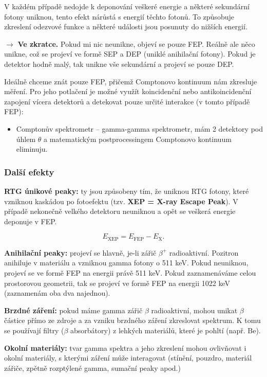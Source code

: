 V každém případě nedojde k deponování veškeré energie a některé sekundární fotony uniknou, tento efekt nárůstá s energií těchto fotonů. To způsobuje zkreslení odezvové funkce a některé události jsou posunuty do nižších energií.

$\rightarrow$ \textbf{Ve zkratce.} Pokud mi nic neunikne, objeví se pouze FEP. Reálně ale něco unikne, což se projeví ve formě SEP a DEP (uniklé anihilační fotony). Pokud je detektor hodně malý, tak unikne vše sekundární a projeví se pouze DEP.

Ideálně chceme znát pouze FEP, přičemž Comptonovo kontinuum nám zkresluje měření. Pro jeho potlačení je možné využít koincidenční nebo antikoincidenční zapojení vícera detektorů a detekovat pouze určité interakce (v tomto případě FEP):

\begin{itemize}
    \item Comptonův spektrometr -- gamma-gamma spektrometr, mám 2 detektory pod úhlem $\theta$ a matematickým postprocessingem Comptonovo kontinuum eliminuju.
\end{itemize}

\subsubsection{Další efekty}

\textbf{RTG únikové peaky:} ty jsou způsobeny tím, že uniknou RTG fotony, které vzniknou kaskádou po fotoefektu (tzv. \textbf{XEP = X-ray Escape Peak}). V případě nekonečně velkého detektoru neuniknou a opět se veškerá energie deponuje v FEP.

$$ E_\text{XEP} = E_\text{FEP} - E_\text{X}. $$

\textbf{Anihilační peaky:} projeví se hlavně, je-li zářič $\beta^+$ radioaktivní. Pozitron anihiluje v materiálu a vzniknou gamma fotony o 511 keV. Pokud neuniknou, projeví se ve formě FEP na energii právě 511 keV. Pokud zaznamenáváme celou prostorovou geometrii, tak se projeví ve formě FEP na energii 1022 keV (zaznamenám oba dva najednou).

\textbf{Brzdné záření:} pokud máme gamma zářič $\beta$ radioaktivní, mohou unikat $\beta$ částice přímo ze zdroje a za vzniku brzdného záření zkreslovat spektrum. K tomu se používají filtry ($\beta$ absorbátory) z lehkých materiálů, které je pohltí (např. Be).

\textbf{Okolní materiály:} tvar gamma spektra a jeho zkreslení mohou ovlivňovat i okolní materiály, s kterými záření může interagovat (stínění, pouzdro, materiál zářiče, zpětně rozptýlené gamma, sumační peaky apod.)

